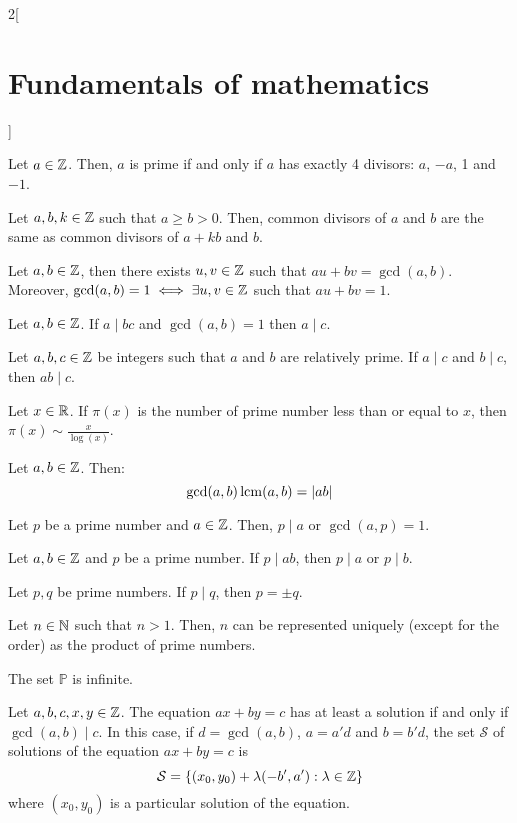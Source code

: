 \documentclass[../../../main_math.tex]{subfiles}
\begin{document}
\begin{multicols}{2}[\section{Fundamentals of mathematics}]
\begin{definition}
  \end{definition}
  \begin{proposition}
    Let $a\in\mathbb{Z}$. Then, $a$ is prime if and only if $a$ has exactly 4 divisors: $a$, $-a$, 1 and $-1$.
  \end{proposition}
  \begin{lemma}
    Let $a,b,k\in\mathbb{Z}$ such that $a\geq b>0$. Then, common divisors of $a$ and $b$ are the same as common divisors of $a+kb$ and $b$.
  \end{lemma}
  \begin{theorem}
    Let $a,b\in\mathbb{Z}$, then there exists $u,v\in\mathbb{Z}$ such that $au+bv=\gcd(a,b)$. Moreover, $\gcd(a,b)=1\iff\exists u,v\in\mathbb{Z}$ such that $au+bv=1$.
  \end{theorem}
  \begin{theorem}
    Let $a,b\in\mathbb{Z}$. If $a\mid bc$ and $\gcd(a,b)=1$ then $a\mid c$.
  \end{theorem}
  \begin{corollary}
    Let $a,b,c\in\mathbb{Z}$ be integers such that $a$ and $b$ are relatively prime. If $a\mid c$ and $b\mid c$, then $ab\mid c$.
  \end{corollary}
  \begin{theorem}
    Let $x\in\mathbb{R}$. If $\pi(x)$ is the number of prime number less than or equal to $x$, then $\pi(x)\sim\frac{x}{\log(x)}$.
  \end{theorem}
  \begin{theorem}
    Let $a,b\in\mathbb{Z}$. Then: $$\gcd(a,b)\operatorname{lcm}(a,b)=|ab|$$
  \end{theorem}
  \begin{lemma}
    Let $p$ be a prime number and $a\in\mathbb{Z}$. Then, $p\mid a$ or $\gcd(a,p)=1$.
  \end{lemma}
  \begin{corollary}
    Let $a,b\in\mathbb{Z}$ and $p$ be a prime number. If $p\mid ab$, then $p\mid a$ or $p\mid b$.
  \end{corollary}
  \begin{corollary}
    Let $p,q$ be prime numbers. If $p\mid q$, then $p=\pm q$.
  \end{corollary}
  \begin{theorem}
    Let $n\in\mathbb{N}$ such that $n>1$. Then, $n$ can be represented uniquely (except for the order) as the product of prime numbers.
  \end{theorem}
  \begin{theorem}
    The set $\mathbb{P}$ is infinite.
  \end{theorem}
  \begin{theorem}
    Let $a,b,c,x,y\in\mathbb{Z}$. The equation $ax+by=c$ has at least a solution if and only if $\gcd(a,b)\mid c$. In this case, if $d=\gcd(a,b)$, $a=a'd$ and $b=b'd$, the set $\mathcal{S}$ of solutions of the equation $ax+by=c$ is $$\mathcal{S}=\{(x_0,y_0)+\lambda(-b',a'):\lambda\in\mathbb{Z}\}$$ where $(x_0,y_0)$ is a particular solution of the equation.
  \end{theorem}

\end{multicols}
\end{document}
